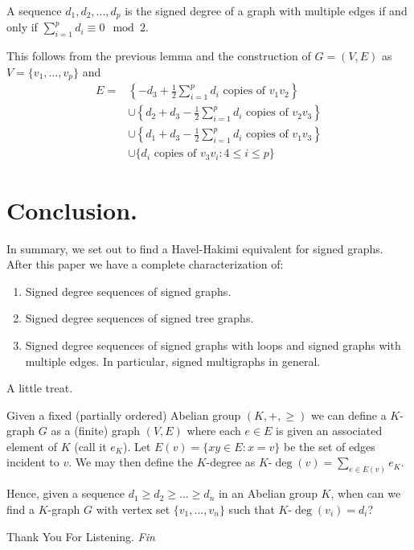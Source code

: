 \begin{frame}
	\begin{theorem}
		A sequence $d_1, d_2, ..., d_p$ is the signed degree of a graph with multiple edges if and only if $\sum_{i = 1}^{p} d_i \equiv 0 \mod 2$.
	\end{theorem}
	This follows from the previous lemma and the construction of $G = (V,E)$ as $V = \{ v_1, ..., v_p \}$ and 
		\begin{align*}
			E = 
				& \left\{ -d_3 + \frac{1}{2}\sum_{i = 1}^{p} d_i \text{ copies of }  v_1v_2\right\} \\
				& \cup \left\{ d_2 + d_3 - \frac{1}{2}\sum_{i = 1}^{p} d_i \text{ copies of } v_2v_3\right\} \\
				& \cup \left\{ d_1 + d_3 - \frac{1}{2}\sum_{i = 1}^{p} d_i \text{ copies of } v_1v_3\right\} \\ 
				& \cup \{ d_i \text{ copies of } v_3v_i : 4 \leq i \leq p \}
		\end{align*}
\end{frame}



\section{Conclusion.}


\begin{frame}
	In summary, we set out to find a Havel-Hakimi equivalent for signed graphs. After this paper we have a complete characterization of:
		\begin{enumerate}
			\item Signed degree sequences of signed graphs.
			\item Signed degree sequences of signed tree graphs.
			\item Signed degree sequences of signed graphs with loops and signed graphs with multiple edges. In particular, signed multigraphs in general.
		\end{enumerate}
\end{frame}


\begin{frame}{A little treat.}
	\begin{problem}
		Given a fixed (partially ordered) Abelian group $(K, +, \geq)$ we can define a $K$-graph $G$ as a (finite) graph $(V,E)$ where each $e \in E$ is given an associated element of $K$ (call it $e_K$). Let $E(v) = \{ xy \in E : x = v \}$ be the set of edges incident to $v$. We may then define the $K$-degree as $K\text{-}\deg(v) = \sum_{e \in E(v)} e_K$. 
		
		Hence, given a sequence $d_1 \geq d_2 \geq ... \geq d_n$ in an Abelian group $K$, when can we find a $K$-graph $G$ with vertex set $\{ v_1, ..., v_n \}$ such that $K\text{-}\deg(v_i) = d_i$? 
	\end{problem}
\end{frame}

\begin{frame}{Thank You For Listening.}
	\centering \Huge
	\emph{Fin}
\end{frame}
